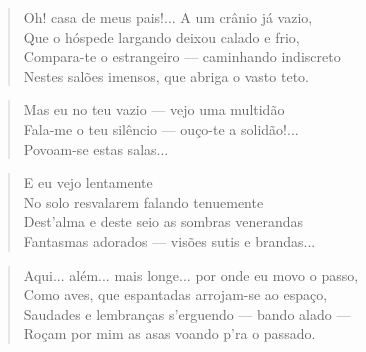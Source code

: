 \begin{anexosenv}
\begin{verse}
Oh! casa de meus pais!... A um crânio já vazio, \\
Que o hóspede largando deixou calado e frio, \\
Compara-te o estrangeiro — caminhando indiscreto \\
Nestes salões imensos, que abriga o vasto teto. \\
\end{verse}

\begin{verse}
Mas eu no teu vazio — vejo uma multidão \\
Fala-me o teu silêncio — ouço-te a solidão!... \\
Povoam-se estas salas... \\
\end{verse}

\begin{verse}
E eu vejo lentamente \\
No solo resvalarem falando tenuemente \\
Dest'alma e deste seio as sombras venerandas \\
Fantasmas adorados — visões sutis e brandas... \\
\end{verse}

\begin{verse}
Aqui... além... mais longe... por onde eu movo o passo, \\
Como aves, que espantadas arrojam-se ao espaço, \\
Saudades e lembranças s'erguendo — bando alado — \\
Roçam por mim as asas voando p'ra o passado. \\
\end{verse}


\end{anexosenv}